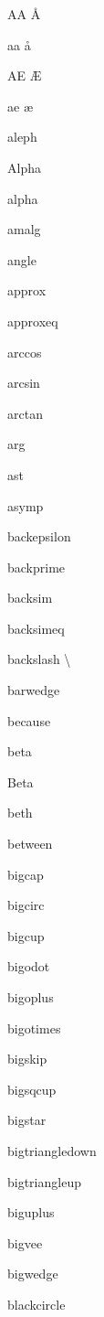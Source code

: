 \documentclass{article}
\begin{document}
AA    \AA{}

aa    \aa{}

AE    \AE{}

ae    \ae{}

aleph    \aleph{}

Alpha    \Alpha{}

alpha    \alpha{}

amalg    \amalg{}

angle    \angle{}

approx    \approx{}

approxeq    \approxeq{}

arccos    \arccos{}

arcsin    \arcsin{}

arctan    \arctan{}

arg    \arg{}

ast    \ast{}

asymp    \asymp{}


backepsilon    \backepsilon{}

backprime    \backprime{}

backsim    \backsim{}

backsimeq    \backsimeq{}

backslash    \backslash{}

barwedge    \barwedge{}

because    \because{}

beta    \beta{}

Beta    \Beta{}

beth    \beth{}

between    \between{}

bigcap    \bigcap{}

bigcirc    \bigcirc{}

bigcup    \bigcup{}

bigodot    \bigodot{}

bigoplus    \bigoplus{}

bigotimes    \bigotimes{}

bigskip    \bigskip{}

bigsqcup    \bigsqcup{}

bigstar    \bigstar{}

bigtriangledown    \bigtriangledown{}

bigtriangleup    \bigtriangleup{}

biguplus    \biguplus{}

bigvee    \bigvee{}

bigwedge    \bigwedge{}

blackcircle    \blackcircle{}
\end{document}
